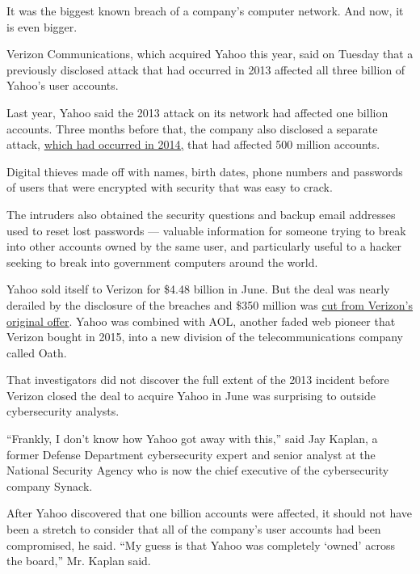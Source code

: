 It was the biggest known breach of a company's computer network. And
now, it is even bigger.

Verizon Communications, which acquired Yahoo this year, said on Tuesday
that a previously disclosed attack that had occurred in 2013 affected
all three billion of Yahoo's user accounts.

Last year, Yahoo said the 2013 attack on its network had affected one
billion accounts. Three months before that, the company also disclosed a
separate attack,
\href{https://www.nytimes.com/2016/09/23/technology/yahoo-hackers.html?action=click\&contentCollection=Technology\&module=RelatedCoverage\&region=Marginalia\&pgtype=article}{which
had occurred in 2014,} that had affected 500 million accounts.

Digital thieves made off with names, birth dates, phone numbers and
passwords of users that were encrypted with security that was easy to
crack.

The intruders also obtained the security questions and backup email
addresses used to reset lost passwords --- valuable information for
someone trying to break into other accounts owned by the same user, and
particularly useful to a hacker seeking to break into government
computers around the world.

Yahoo sold itself to Verizon for \$4.48 billion in June. But the deal
was nearly derailed by the disclosure of the breaches and \$350 million
was
\href{https://www.nytimes.com/2017/02/21/technology/verizon-will-pay-350-million-less-for-yahoo.html?_r=0}{cut
from Verizon's original offer}. Yahoo was combined with AOL, another
faded web pioneer that Verizon bought in 2015, into a new division of
the telecommunications company called Oath.

That investigators did not discover the full extent of the 2013 incident
before Verizon closed the deal to acquire Yahoo in June was surprising
to outside cybersecurity analysts.

``Frankly, I don't know how Yahoo got away with this,'' said Jay Kaplan,
a former Defense Department cybersecurity expert and senior analyst at
the National Security Agency who is now the chief executive of the
cybersecurity company Synack.

After Yahoo discovered that one billion accounts were affected, it
should not have been a stretch to consider that all of the company's
user accounts had been compromised, he said. ``My guess is that Yahoo
was completely `owned' across the board,'' Mr. Kaplan said.


